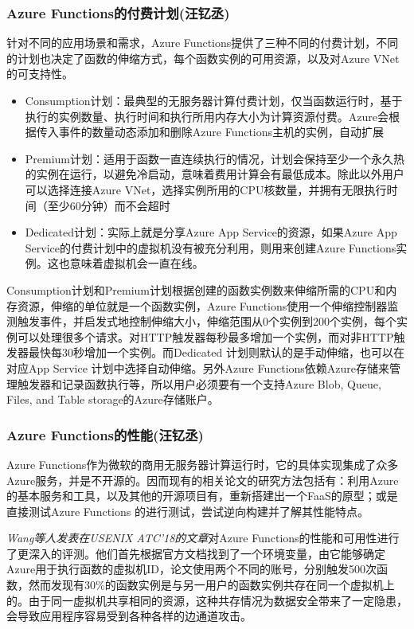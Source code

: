 \documentclass[11pt]{article}
\begin{document}
\subsubsection{Azure Functions的付费计划(汪钇丞)}
针对不同的应用场景和需求，Azure Functions提供了三种不同的付费计划，不同的计划也决定了函数的伸缩方式，每个函数实例的可用资源，以及对Azure VNet的可支持性。
\begin{itemize}
	\setlength{\itemsep}{0pt}
	\setlength{\parsep}{0pt}
	\setlength{\parskip}{0pt}
	\item Consumption计划：最典型的无服务器计算付费计划，仅当函数运行时，基于执行的实例数量、执行时间和执行所用内存大小为计算资源付费。Azure会根据传入事件的数量动态添加和删除Azure Functions主机的实例，自动扩展
	\item Premium计划：适用于函数一直连续执行的情况，计划会保持至少一个永久热的实例在运行，以避免冷启动，意味着费用计算会有最低成本。除此以外用户可以选择连接Azure VNet，选择实例所用的CPU核数量，并拥有无限执行时间（至少60分钟）而不会超时
	\item Dedicated计划：实际上就是分享Azure App Service的资源，如果Azure App Service的付费计划中的虚拟机没有被充分利用，则用来创建Azure Functions实例。这也意味着虚拟机会一直在线。
\end{itemize}
Consumption计划和Premium计划根据创建的函数实例数来伸缩所需的CPU和内存资源，伸缩的单位就是一个函数实例，Azure Functions使用一个伸缩控制器监测触发事件，并启发式地控制伸缩大小，伸缩范围从0个实例到200个实例，每个实例可以处理很多个请求。对HTTP触发器每秒最多增加一个实例，而对非HTTP触发器最快每30秒增加一个实例。而Dedicated 计划则默认的是手动伸缩，也可以在对应App Service 计划中选择自动伸缩。另外Azure Functions依赖Azure存储来管理触发器和记录函数执行等，所以用户必须要有一个支持Azure Blob, Queue, Files, and Table storage的Azure存储账户。

\subsubsection{Azure Functions的性能(汪钇丞)}
Azure Functions作为微软的商用无服务器计算运行时，它的具体实现集成了众多Azure服务，并是不开源的。因而现有的相关论文的研究方法包括有：利用Azure的基本服务和工具，以及其他的开源项目有，重新搭建出一个FaaS的原型\cite{mcgrath2017serverless}；或是直接测试Azure Functions 的进行测试，尝试逆向构建并了解其性能特点\cite{wang2018peeking}。

\cite{wang2018peeking}{\textit{Wang等人发表在USENIX ATC’18的文章}}对Azure Functions的性能和可用性进行了更深入的评测。他们首先根据官方文档找到了一个环境变量，由它能够确定Azure用于执行函数的虚拟机ID，论文使用两个不同的账号，分别触发500次函数，然而发现有30\%的函数实例是与另一用户的函数实例共存在同一个虚拟机上的。由于同一虚拟机共享相同的资源，这种共存情况为数据安全带来了一定隐患，会导致应用程序容易受到各种各样的边通道攻击。
\end{document}
